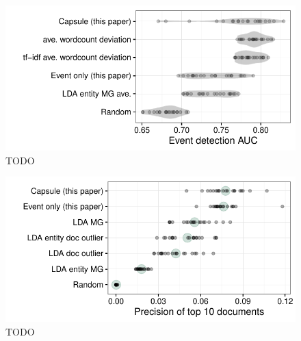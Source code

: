 \begin{figure}
\centering
\includegraphics[width=\linewidth]{fig/sim_eventdetect.pdf}
\caption{TODO}
\label{fig:sim_eventdetect}
\end{figure}

\begin{figure}
\centering
\includegraphics[width=\linewidth]{fig/precision10.pdf}
\caption{TODO}
\label{fig:sim_precision}
\end{figure}




